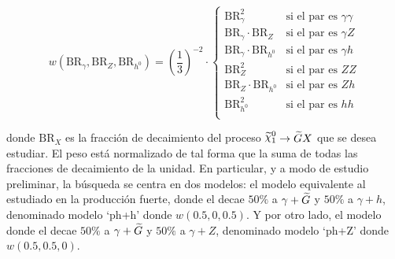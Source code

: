 

\begin{equation}
  w(\text{BR}_{\gamma}, \text{BR}_{Z}, \text{BR}_{h^{0}})=\left(\frac{1}{3}\right)^{-2}\cdot\begin{cases}
    \text{BR}_{\gamma}^{2} & \text{si el par es } \gamma\gamma \\
    \text{BR}_{\gamma}\cdot\text{BR}_{Z} & \text{si el par es } \gamma Z \\
    \text{BR}_{\gamma}\cdot\text{BR}_{h^{0}} & \text{si el par es } \gamma h \\
    \text{BR}_{Z}^{2} & \text{si el par es } ZZ \\
    \text{BR}_{Z}\cdot\text{BR}_{h^{0}} & \text{si el par es } Zh \\
    \text{BR}_{h^{0}}^{2} & \text{si el par es } hh \\
  \end{cases}
\end{equation}

\noindent
donde $\text{BR}_{X}$ es la fracción de decaimiento del proceso $\ninoone \to \gravino X$ que se desea estudiar.
El peso está normalizado de tal forma que la suma de todas las fracciones de decaimiento de la unidad. En particular, y a modo de estudio preliminar, la búsqueda se centra en dos modelos: el modelo equivalente al estudiado en la producción fuerte, donde el \ninoone decae $50\%$ a $\gamma + \widetilde{G}$ y $50\%$ a $\gamma + h$, denominado modelo `ph+h' donde $w(0.5, 0, 0.5)$. Y por otro lado, el modelo donde el \ninoone decae $50\%$ a $\gamma + \widetilde{G}$ y $50\%$ a $\gamma + Z$, denominado modelo `ph+Z' donde $w(0.5, 0.5, 0)$.

